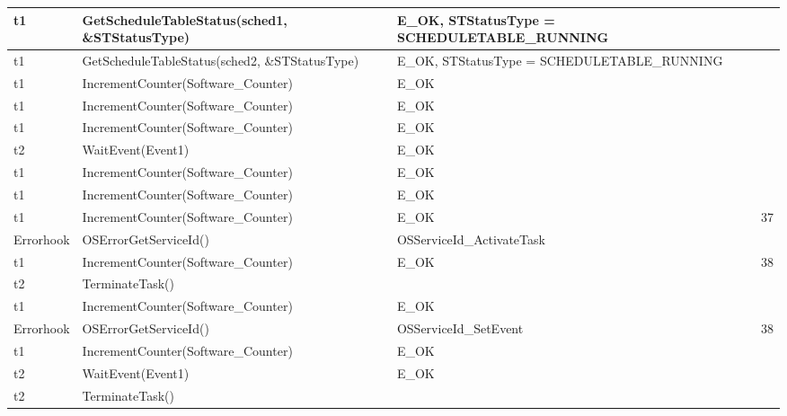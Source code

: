 \documentclass[10pt]{article}
\newlength{\Li}\settowidth{\Li}{Running}
\newlength{\Lii}\setlength{\Lii}{7cm}
\newlength{\Liiii}\setlength{\Liiii}{0.9cm}
\newlength{\Liii}\setlength{\Liii}{\textwidth} \addtolength{\Liii}{-\Li} \addtolength{\Liii}{-\Lii} \addtolength{\Liii}{-\Liiii}
\begin{document}
	\begin{supertabular}{|p{\Li}|p{\Lii}|p{\Liii}|p{\Liiii}|} \hline 
	t1		& GetScheduleTableStatus(sched1, \&STStatusType)							& E\_OK, STStatusType = SCHEDULETABLE\_RUNNING		& \\ \hline
	t1		& GetScheduleTableStatus(sched2, \&STStatusType)							& E\_OK, STStatusType = SCHEDULETABLE\_RUNNING		& \\ \hline
	t1		& IncrementCounter(Software\_Counter)										& E\_OK												& \\ \hline
	t1		& IncrementCounter(Software\_Counter)										& E\_OK												& \\ \hline
	t1		& IncrementCounter(Software\_Counter)										& E\_OK												& \\ \hline

	t2		& WaitEvent(Event1)														& E\_OK												& \\ \hline

	t1		& IncrementCounter(Software\_Counter)										& E\_OK												& \\ \hline
	t1		& IncrementCounter(Software\_Counter)										& E\_OK												& \\ \hline
	t1		& IncrementCounter(Software\_Counter)										& E\_OK												& 37 \\ \hline
	Errorhook	& OSErrorGetServiceId()													& OSServiceId\_ActivateTask								& \\ \hline
	t1		& IncrementCounter(Software\_Counter)										& E\_OK												& 38 \\ \hline
	t2		& TerminateTask()														& 													& \\ \hline
	t1		& IncrementCounter(Software\_Counter)										& E\_OK												& \\ \hline
	Errorhook	& OSErrorGetServiceId()													& OSServiceId\_SetEvent									& 38 \\ \hline
	t1		& IncrementCounter(Software\_Counter)										& E\_OK												& \\ \hline
	t2		& WaitEvent(Event1)														& E\_OK												& \\ \hline
	t2		& TerminateTask()														& 													& \\ \hline


\end{supertabular}
\end{document}
